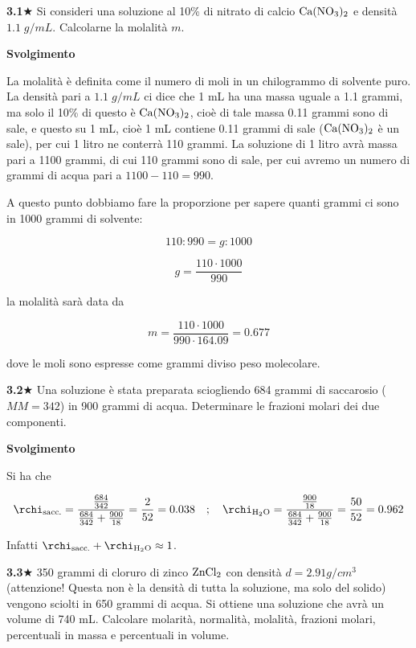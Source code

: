 \textbf{3.1}$\bigstar$ Si consideri una soluzione al 10\% di nitrato di calcio $\rm Ca(NO_3)_2$ e densità $1.1\;g/mL$. Calcolarne la molalità $m$.

\vspace{0.2cm}\large\textbf{Svolgimento}\normalsize

\vspace{0.2cm}La molalità è definita come il numero di moli in un chilogrammo di solvente puro. La densità pari a $1.1\;g/mL$ ci dice che 1 mL ha una massa uguale a 1.1 grammi, ma solo il 10\% di questo è $\rm Ca(NO_3)_2$, cioè di tale massa 0.11 grammi sono di sale, e questo su 1 mL, cioè 1 mL contiene 0.11 grammi di sale ($\rm Ca(NO_3)_2$ è un sale), per cui 1 litro ne conterrà 110 grammi. La soluzione di 1 litro avrà massa pari a 1100 grammi, di cui 110 grammi sono di sale, per cui avremo un numero di grammi di acqua pari a $1100-110=990$.

A questo punto dobbiamo fare la proporzione per sapere quanti grammi ci sono in 1000 grammi di solvente:

$$110:990=g:1000$$

$$g=\frac{110 \cdot 1000}{990}$$

la molalità sarà data da

$$m=\frac{110 \cdot 1000}{990 \cdot 164.09}=0.677$$

dove le moli sono espresse come grammi diviso peso molecolare.

\vspace{0.2cm}\textbf{3.2}$\bigstar$ Una soluzione è stata preparata sciogliendo 684 grammi di saccarosio ($MM=342$) in 900 grammi di acqua. Determinare le frazioni molari dei due componenti.

\vspace{0.2cm}\large\textbf{Svolgimento}\normalsize

\vspace{0.2cm}Si ha che

$$\rchi_{\text{sacc.}}=\frac{\frac{684}{342}}{\frac{684}{342} + \frac{900}{18}}=\frac{2}{52}=0.038
\quad;\quad
\rchi_{\text{H}_2\text{O}}=\frac{\frac{900}{18}}{\frac{684}{342} + \frac{900}{18}}=\frac{50}{52}=0.962$$

\vspace{0.2cm}Infatti $\rchi_{\text{sacc.}} + \rchi_{\text{H}_2\text{O}}\approx 1$.

\vspace{0.2cm}\textbf{3.3}$\bigstar$ 350 grammi di cloruro di zinco $\rm ZnCl_2$ con densità $d=2.91 g/cm^3$ (attenzione! Questa non è la densità di tutta la soluzione, ma solo del solido) vengono sciolti in 650 grammi di acqua. Si ottiene una soluzione che avrà un volume di 740 mL. Calcolare molarità, normalità, molalità, frazioni molari, percentuali in massa e percentuali in volume.

